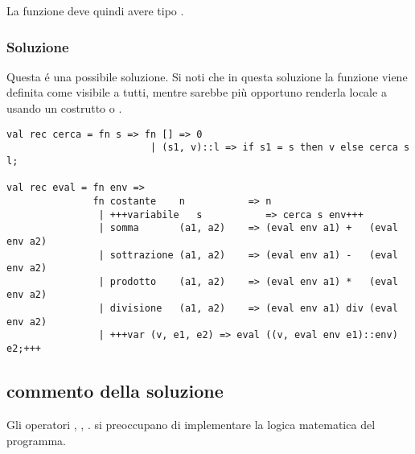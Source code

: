 \medskip
La funzione  deve quindi avere tipo .

\subsubsection{Soluzione}

Questa é una possibile soluzione. %
Si noti che in questa soluzione la funzione  viene definita come visibile a tutti, mentre sarebbe più opportuno renderla locale a  usando un costrutto  o .

\begin{lstlisting}[style = SML, caption = {Definizione della funzione \sml{eval}}]
val rec cerca = fn s => fn [] => 0
						 | (s1, v)::l => if s1 = s then v else cerca s l;

val rec eval = fn env =>
			   fn costante    n           => n
			   	| +++variabile   s           => cerca s env+++
				| somma       (a1, a2)    => (eval env a1) +   (eval env a2)
				| sottrazione (a1, a2)    => (eval env a1) -   (eval env a2)
				| prodotto    (a1, a2)    => (eval env a1) *   (eval env a2)
				| divisione   (a1, a2)    => (eval env a1) div (eval env a2)
				| +++var (v, e1, e2) => eval ((v, eval env e1)::env) e2;+++
\end{lstlisting}

\subsection{commento della soluzione}

Gli operatori \sml{+}, \sml{-}, \sml{*}.  si preoccupano di implementare la logica matematica del programma.
